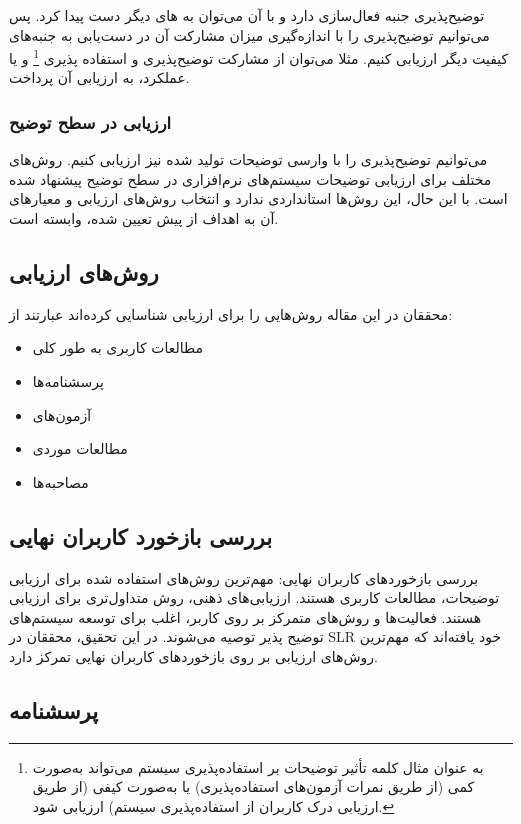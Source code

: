 توضیح‌پذیری جنبه فعال‌سازی دارد و با آن می‌توان به های دیگر دست پیدا
کرد. پس می‌توانیم توضیح‌پذیری را با اندازه‌گیری میزان مشارکت آن در دست‌یابی به
جنبه‌های کیفیت دیگر ارزیابی کنیم. مثلا می‌توان از مشارکت توضیح‌پذیری و استفاده
پذیری \footnote{ به عنوان مثال کلمه  تأثیر توضیحات بر
استفاده‌پذیری سیستم می‌تواند به‌صورت کمی (از طریق نمرات آزمون‌های استفاده‌پذیری)
یا به‌صورت کیفی (از طریق ارزیابی درک کاربران از استفاده‌پذیری سیستم) ارزیابی
شود.} و یا عملکرد، به ارزیابی آن پرداخت.

\subsubsection{ارزیابی در سطح توضیح}

می‌توانیم توضیح‌پذیری را با وارسی توضیحات تولید شده نیز ارزیابی کنیم. روش‌های
مختلف برای ارزیابی توضیحات سیستم‌های نرم‌افزاری در سطح توضیح پیشنهاد شده است. با
این حال، این روش‌ها استانداردی ندارد و انتخاب روش‌های ارزیابی و معیارهای آن به
اهداف از پیش تعیین شده، وابسته است.

\subsection{روش‌های ارزیابی}

محققان در این مقاله روش‌هایی را برای ارزیابی شناسایی کرده‌اند عبارتند از:

\begin{itemize}
    \item مطالعات کاربری به طور کلی
    \item پرسشنامه‌ها
    \item آزمون‌های 
    \item مطالعات موردی
    \item مصاحبه‌ها
\end{itemize}

\subsection{بررسی بازخورد کاربران نهایی}

بررسی بازخوردهای کاربران نهایی: مهم‌ترین روش‌های استفاده شده برای ارزیابی
توضیحات، مطالعات کاربری هستند. ارزیابی‌های ذهنی، روش متداول‌تری برای ارزیابی
هستند. فعالیت‌ها و روش‌های متمرکز بر روی کاربر، اغلب برای توسعه سیستم‌های توضیح
پذیر توصیه می‌شوند. در این تحقیق، محققان در SLR خود یافته‌اند که مهم‌ترین
روش‌های ارزیابی بر روی بازخوردهای کاربران نهایی تمرکز دارد.

\subsection{پرسشنامه}

